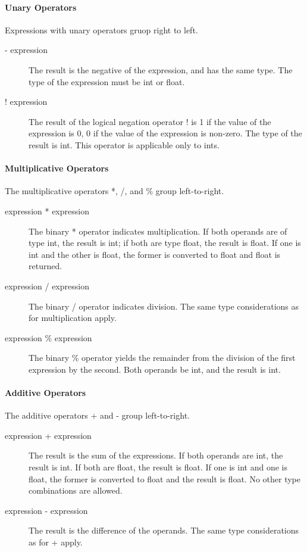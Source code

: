 \documentclass[a4paper]{article}
\begin{document}
\paragraph{Unary Operators}
Expressions with unary operators gruop right to left.
\begin{description}
\item[- expression]
The result is the negative of the expression, and has the same type. The type of the expression must be int or float.
\item[! expression]
The result of the logical negation operator ! is 1 if the value of the expression is 0, 0 if the value of the expression is non-zero. The type of the result is int. This operator is applicable only to ints.
\end{description}

\paragraph{Multiplicative Operators}
The multiplicative operators *, /, and \% group left-to-right.
\begin{description}
\item[expression * expression]
The binary * operator indicates multiplication. If both operands are of type int, the result is int; if both are type float, the result is float. If one is int and the other is float, the former is converted to float and float is returned.
\item[expression / expression]
The binary / operator indicates division. The same type considerations as for multiplication apply.
\item[expression \% expression]
The binary \% operator yields the remainder from the division of the first expression by the second. Both operands be int, and the result is int.
\end{description}

\paragraph{Additive Operators}
The additive operators + and - group left-to-right.
\begin{description}
\item[expression + expression]
The result is the sum of the expressions. If both operands are int, the result is int. If both are float, the result is float. If one is int and one is float, the former is converted to float and the result is float. No other type combinations are allowed.
\item[expression - expression]
The result is the difference of the operands. The same type considerations as for + apply.
\end{description}
\end{document}
